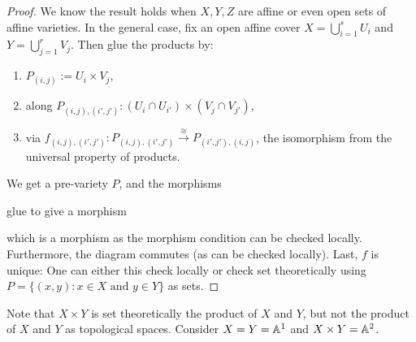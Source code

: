 \begin{proof}
  We know the result holds when
  $X, Y, Z$ are affine or even
  open sets of affine varieties. In the
  general case, fix an open affine cover
  $X = \bigcup_{i = 1}^s U_i$
  and $Y = \bigcup_{j = 1}^r V_j$. Then
  glue the products by:
  \begin{enumerate}
    \item $P_{(i, j)} := U_i \times V_j$,
    \item along $P_{(i, j), (i', j')} :
      (U_i \cap U_{i'}) \times (V_j \cap V_{j'})$,
    \item via
      $f_{(i, j), (i', j')} :
      P_{(i, j), (i', j')} \overset{\cong}{\to}
      P_{(i', j'), (i, j)}$, the
      isomorphism from the universal
      property of products.
  \end{enumerate}
  We get a pre-variety $P$, and the morphisms
  \begin{center}
  \end{center}
  glue to give a morphism
  \begin{center}
  \end{center}
  which is a morphism as the morphism
  condition can be checked locally.
  Furthermore, the diagram commutes
  (as can be checked locally). Last,
  $f$ is unique: One can either this check
  locally or check set theoretically
  using $P = \{(x, y) : x \in X \text{ and } y \in Y\}$
  as sets.
\end{proof}

\begin{remark}
  Note that $X \times Y$ is set theoretically
  the product of $X$ and $Y$, but
  not the product of $X$ and $Y$
  as topological spaces.
  Consider $X = Y = \mathbb{A}^1$
  and $X \times Y = \mathbb{A}^2$.
\end{remark}

